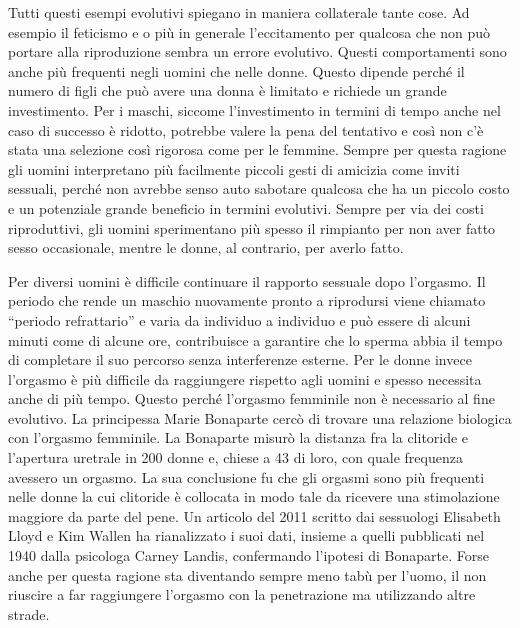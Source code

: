 \documentclass[12pt]{book} %
\begin{document}
Tutti questi esempi evolutivi spiegano in maniera collaterale tante cose. Ad esempio il feticismo e o più in generale
l'eccitamento per qualcosa che non può portare alla riproduzione sembra un errore evolutivo.
Questi comportamenti sono anche più frequenti negli uomini che nelle donne. Questo dipende perché il numero di figli
che può avere una donna è limitato e richiede un grande investimento. Per i maschi, siccome
l'investimento in termini di tempo anche nel caso di successo è ridotto, potrebbe valere la pena
del tentativo e così non c'è stata una selezione così rigorosa come per le femmine. Sempre per
questa ragione gli uomini interpretano più facilmente piccoli gesti di amicizia come inviti sessuali, perché non
avrebbe senso auto sabotare qualcosa che ha un piccolo costo e un potenziale grande beneficio in termini evolutivi.
Sempre per via dei costi riproduttivi, gli uomini sperimentano più spesso il rimpianto per non aver fatto sesso
occasionale, mentre le donne, al contrario, per averlo
fatto.

Per diversi uomini è difficile continuare il rapporto sessuale dopo l'orgasmo. Il periodo che rende
un maschio nuovamente pronto a riprodursi viene chiamato “periodo refrattario” e varia da individuo a individuo e può
essere di alcuni minuti come di alcune ore, contribuisce a garantire che lo sperma abbia il tempo di completare il suo
percorso senza interferenze esterne. Per le donne invece l'orgasmo è più difficile da raggiungere
rispetto agli uomini e spesso necessita anche di più tempo. Questo perché l'orgasmo femminile non
è necessario al fine evolutivo. La principessa Marie Bonaparte cercò di trovare una relazione biologica con
l'orgasmo femminile. La Bonaparte misurò la distanza fra la clitoride e
l'apertura uretrale in 200 donne e, chiese a 43 di loro, con quale frequenza avessero un orgasmo.
La sua conclusione fu che gli orgasmi sono più frequenti nelle donne la cui clitoride è collocata in modo tale da
ricevere una stimolazione maggiore da parte del pene. Un articolo del 2011 scritto dai sessuologi Elisabeth Lloyd e Kim
Wallen ha rianalizzato i suoi dati, insieme a quelli pubblicati nel 1940 dalla psicologa Carney Landis, confermando
l'ipotesi di Bonaparte. Forse anche per questa ragione sta diventando sempre meno tabù per
l'uomo, il non riuscire a far raggiungere l'orgasmo con la penetrazione ma
utilizzando altre strade.
\end{document}
